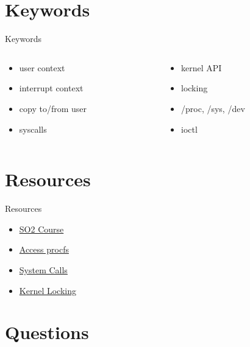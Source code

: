 \documentclass{workshop}
\begin{document}
\section{Keywords}
\begin{frame}{Keywords}
  \begin{columns}
    \begin{column}[l]{0.5\textwidth}
      \begin{itemize}
        \item user context
        \item interrupt context
        \item copy to/from user
        \item syscalls
      \end{itemize}
    \end{column}
    \begin{column}[l]{0.5\textwidth}
      \begin{itemize}
        \item kernel API
        \item locking
        \item /proc, /sys, /dev
        \item ioctl
      \end{itemize}
    \end{column}
  \end{columns}
\end{frame}

\section{Resources}
\begin{frame}{Resources}
  \begin{itemize}
  \item \href{http://elf.cs.pub.ro/so2/wiki/}{SO2 Course}
  \item \href{http://www.ibm.com/developerworks/linux/library/l-proc/index.html}{Access procfs}
  \item \href{http://articles.manugarg.com/systemcallinlinux2_6.html}{System Calls}
  \item \href{http://www.kernel.org/pub/linux/kernel/people/rusty/kernel-locking/c214.html}{Kernel Locking}
  \end{itemize}
\end{frame}

\section{Questions}
\end{document}
